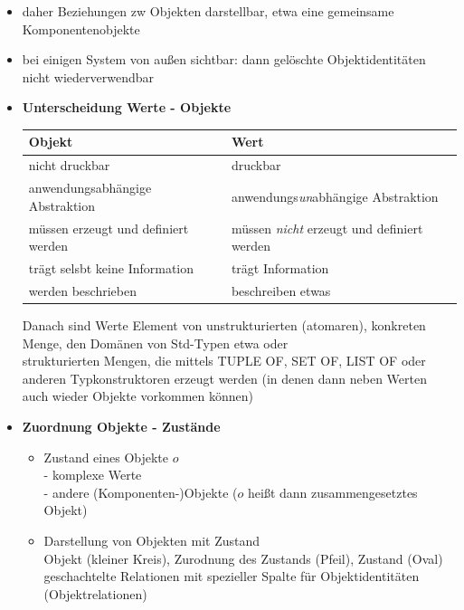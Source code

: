 \begin{itemize}
	\item daher Beziehungen zw Objekten darstellbar, etwa eine gemeinsame Komponentenobjekte
	\item bei einigen System von außen sichtbar: dann gelöschte Objektidentitäten nicht wiederverwendbar
	\item \textbf{Unterscheidung Werte - Objekte}
	\begin{table}[!h]
		\centering
		\begin{tabular}{|p{20em}|p{20em}|}
			\hline
			Objekt	& Wert\\
			\hline
			\hline
			nicht druckbar	& druckbar\\
			\hline
			anwendungsabhängige Abstraktion	& anwendungs\textit{un}abhängige Abstraktion\\
			\hline
			müssen erzeugt und definiert werden & müssen \textit{nicht} erzeugt und definiert werden\\
			\hline
			trägt selsbt keine Information & trägt Information\\
			\hline
			werden beschrieben & beschreiben etwas\\
			\hline
		\end{tabular}
	\end{table}

	Danach sind Werte Element von unstrukturierten (atomaren), konkreten Menge, den Domänen von Std-Typen etwa oder\\
	strukturierten Mengen, die mittels TUPLE OF, SET OF, LIST OF oder anderen Typkonstruktoren erzeugt werden (in denen dann neben Werten auch wieder Objekte vorkommen können)
	
	\item \textbf{Zuordnung Objekte - Zustände}
	\begin{itemize}
		\item Zustand eines Objekte $o$\\
		- komplexe Werte\\
		- andere (Komponenten-)Objekte ($o$ heißt dann zusammengesetztes Objekt)
		
		\item Darstellung von Objekten mit Zustand\\
		Objekt (kleiner Kreis), Zurodnung des Zustands (Pfeil), Zustand (Oval)\\
		geschachtelte Relationen mit spezieller Spalte für Objektidentitäten (Objektrelationen)
	\end{itemize}
	

\end{itemize}
